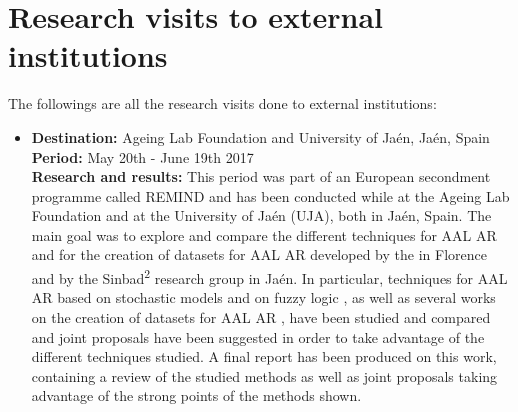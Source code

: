 
\section*{Research visits to external institutions}

  The followings are all the research visits done to external institutions:
  
  \begin{itemize}
    \item
      \textbf{Destination:} Ageing Lab Foundation and University of Jaén, Jaén, Spain\\
      \textbf{Period:} May 20th - June 19th 2017\\
      \textbf{Research and results:} This period was part of an European secondment programme called REMIND and has been conducted while at the Ageing Lab Foundation \cite{ageinglab} and at the University of Jaén (\ac{UJA}), both in Jaén, Spain. The main goal was to explore and compare the different techniques for \ac{AAL} \ac{AR} and for the creation of datasets for \ac{AAL} \ac{AR} developed by the  \cite{stlab} in Florence and by the Sinbad\textsuperscript{2} research group \cite{sinbad2} in Jaén. In particular, techniques for \ac{AAL} \ac{AR} based on stochastic models \cite{biagi2016stochastic,carnevali2015continuous} and on fuzzy logic \cite{medina2015activity}, as well as several works on the creation of datasets for \ac{AAL} \ac{AR} \cite{patara2015recommendations,quesada2015generation}, have been studied and compared and joint proposals have been suggested in order to take advantage of the different techniques studied. A final report has been produced on this work, containing a review of the studied methods as well as joint proposals taking advantage of the strong points of the methods shown.
  \end{itemize}

\newpage
